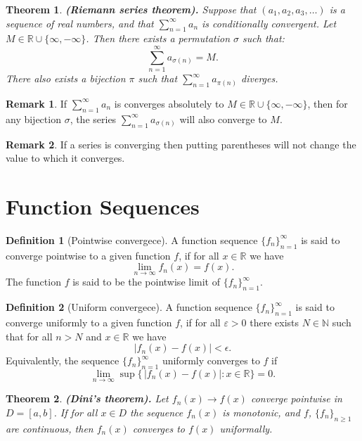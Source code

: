 \documentclass[11pt,a4paper]{article}
\theoremstyle{definition}
\newtheorem{definition}{Definition}[section]
\newtheorem{remark}{Remark}[section]
\theoremstyle{plain}
\newtheorem{theorem}{Theorem}[section]
\newcommand{\N}{\mathbb{N}}
\newcommand{\R}{\mathbb{R}}
\newcommand{\abs}[1]{\left\lvert #1\right\rvert}
\renewcommand{\tt}[1]{\textnormal{\textbf{(#1).}}} %
\begin{document}
  \begin{theorem}\tt{Riemann series theorem}
    Suppose that $(a_{1}, a_{2}, a_{3}, \ldots)$ is a sequence of real numbers, 
    and that $\sum_{n=1}^{\infty} a_n$ is conditionally convergent. 
    Let $M \in \R \cup \{\infty,-\infty\}$.
    Then there exists a permutation $\sigma$ such that:
    \[
      \sum_{n=1}^{\infty} a_{\sigma(n)} = M.
    \] 
    There also exists a bijection $\pi$ such that
    $\sum_{n=1}^{\infty} a_{\pi(n)}$ diverges.
  \end{theorem}
  \begin{remark}
    If $\sum_{n=1}^{\infty} a_n$ is converges absolutely to 
    $M \in \R \cup \{\infty, -\infty\}$,
    then for any bijection $\sigma$, the series
    $\sum_{n=1}^{\infty} a_{\sigma(n)}$ will also converge to $M$.
  \end{remark}
  \begin{remark}
    If a series is converging then putting parentheses will not change the
    value to which it converges.
  \end{remark}

  \newpage
  
  \section{Function Sequences}
  \begin{definition}[Pointwise convergece]
    A function sequence $\{f_n\}_{n=1}^{\infty}$ is said to converge
    pointwise to a given function $f$, if for all $x \in \R$ we have
    \[
      \lim _{n \to \infty } f_{n}(x) = f(x).
    \]
    The function $f$ is said to be the pointwise limit of
    $\{f_n\}_{n=1}^{\infty}$.
  \end{definition}

  \begin{definition}[Uniform convergece]
    A function sequence $\{f_n\}_{n=1}^{\infty}$ is said to converge
    uniformly to a given function $f$, if for all $\varepsilon > 0$ there
    exists $N \in \N$ such that for all $n > N$ and $x \in \R$ we have
    \[
      \abs{f_{n}(x) - f(x)} < \epsilon.
    \]
    Equivalently, the sequence $\{f_n\}_{n=1}^{\infty}$ uniformly converges
    to $f$ if
    \[
      \lim_{n \to \infty }
      \sup\{\,\abs{f_{n}(x) - f(x)}:x\in \R\} = 0.
    \]
  \end{definition}

  \begin{theorem}\tt{Dini's theorem}
    Let $f_n(x)\to f(x)$ converge pointwise in $D = [a,b]$.
    If for all $x \in D$ the sequence $f_n(x)$ is monotonic,
    and $f$, $\{f_n\}_{n \geq 1}$ are continuous,
    then $f_n(x)$ converges to $f(x)$ uniformally.
  \end{theorem}
\end{document}
